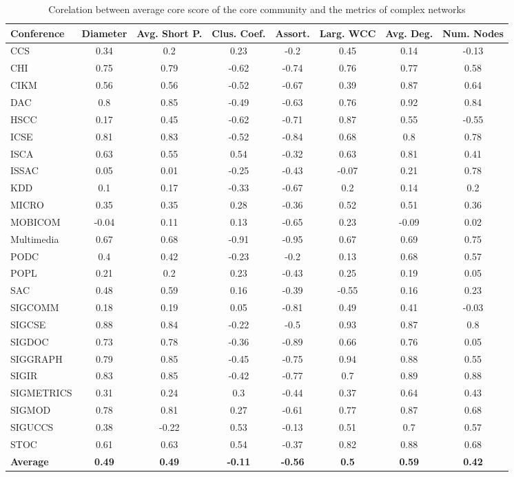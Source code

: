 \begin{table}[!htb]
\centering
\caption{Corelation between average core score of the core community and the metrics of complex networks}
\label{tab:correlation_metrics}
{\small
\begin{tabular}{|l|c|c|c|c|c|c|c|} \hline
Conference & \bf Diameter & \bf Avg. Short P. & \bf Clus. Coef. & \bf Assort. & \bf Larg. WCC & \bf Avg. Deg. & \bf Num. Nodes\\ \hline
CCS & 0.34 & 0.2 & 0.23 & -0.2 & 0.45 & 0.14 & -0.13\\ \hline
CHI & 0.75 & 0.79 & -0.62 & -0.74 & 0.76 & 0.77 & 0.58\\ \hline
CIKM & 0.56 & 0.56 & -0.52 & -0.67 & 0.39 & 0.87 & 0.64\\ \hline
DAC & 0.8 & 0.85 & -0.49 & -0.63 & 0.76 & 0.92 & 0.84\\ \hline
HSCC & 0.17 & 0.45 & -0.62 & -0.71 & 0.87 & 0.55 & -0.55\\ \hline
ICSE & 0.81 & 0.83 & -0.52 & -0.84 & 0.68 & 0.8 & 0.78\\ \hline
ISCA & 0.63 & 0.55 & 0.54 & -0.32 & 0.63 & 0.81 & 0.41\\ \hline
ISSAC & 0.05 & 0.01 & -0.25 & -0.43 & -0.07 & 0.21 & 0.78\\ \hline
KDD & 0.1 & 0.17 & -0.33 & -0.67 & 0.2 & 0.14 & 0.2\\ \hline
MICRO & 0.35 & 0.35 & 0.28 & -0.36 & 0.52 & 0.51 & 0.36\\ \hline
MOBICOM & -0.04 & 0.11 & 0.13 & -0.65 & 0.23 & -0.09 & 0.02\\ \hline
Multimedia & 0.67 & 0.68 & -0.91 & -0.95 & 0.67 & 0.69 & 0.75\\ \hline
PODC & 0.4 & 0.42 & -0.23 & -0.2 & 0.13 & 0.68 & 0.57\\ \hline
POPL & 0.21 & 0.2 & 0.23 & -0.43 & 0.25 & 0.19 & 0.05\\ \hline
SAC & 0.48 & 0.59 & 0.16 & -0.39 & -0.55 & 0.16 & 0.23\\ \hline
SIGCOMM & 0.18 & 0.19 & 0.05 & -0.81 & 0.49 & 0.41 & -0.03\\ \hline
SIGCSE & 0.88 & 0.84 & -0.22 & -0.5 & 0.93 & 0.87 & 0.8\\ \hline
SIGDOC & 0.73 & 0.78 & -0.36 & -0.89 & 0.66 & 0.76 & 0.05\\ \hline
SIGGRAPH & 0.79 & 0.85 & -0.45 & -0.75 & 0.94 & 0.88 & 0.55\\ \hline
SIGIR & 0.83 & 0.85 & -0.42 & -0.77 & 0.7 & 0.89 & 0.88\\ \hline
SIGMETRICS & 0.31 & 0.24 & 0.3 & -0.44 & 0.37 & 0.64 & 0.43\\ \hline
SIGMOD & 0.78 & 0.81 & 0.27 & -0.61 & 0.77 & 0.87 & 0.68\\ \hline
SIGUCCS & 0.38 & -0.22 & 0.53 & -0.13 & 0.51 & 0.7 & 0.57\\ \hline
STOC & 0.61 & 0.63 & 0.54 & -0.37 & 0.82 & 0.88 & 0.68\\ \hline
{\bf Average} & {\bf 0.49} & {\bf 0.49} & {\bf -0.11} & {\bf -0.56} & {\bf 0.5} & {\bf 0.59} & {\bf 0.42}\\ \hline
\end{tabular}
}
\end{table}



